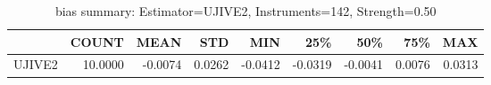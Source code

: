 \begin{table}[ht]
\centering
\caption{bias summary: Estimator=UJIVE2, Instruments=142, Strength=0.50}
\begin{tabular}{lrrrrrrrr}
\toprule
 & COUNT & MEAN & STD & MIN & 25\% & 50\% & 75\% & MAX \\
\midrule
UJIVE2 & 10.0000 & -0.0074 & 0.0262 & -0.0412 & -0.0319 & -0.0041 & 0.0076 & 0.0313 \\
\bottomrule
\end{tabular}
\end{table}
